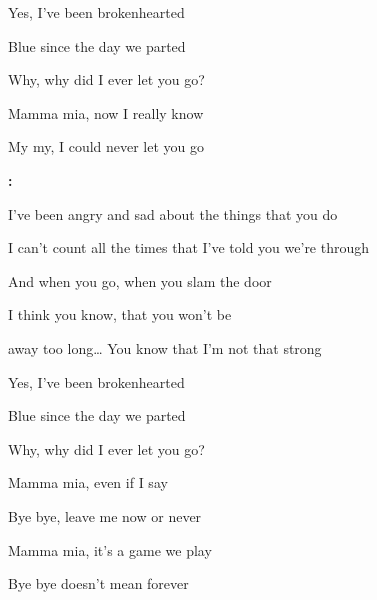 \begin{song}
\smallskip

\begin{chorusbox}{\Bridge}
Yes, I've been brokenhearted \par
{}Blue since the day we parted \par
{} Why, why did I ever let you go? \par
{} Mamma mia,  now I really know \par
{} My my, I could never let you go \par
\end{chorusbox}

\bigskip

\Instrumental\textbf{:}     \par

\bigskip

I've been angry and sad about the things that you do \par
{}I can't count all the times that I've told you we're through \par
{}And when you go,  when you slam the door \par
{}I think you know,  that you won't be \par
away too long… You know that I'm not that strong  \par

\bigskip

\PrechorusAndChorus

\bigskip

Yes, I've been brokenhearted \par
{}Blue since the day we parted \par
{} Why, why did I ever let you go? \par

\bigskip

Mamma mia, even if I say \par
{} Bye bye, leave me now or never \par
{}Mamma mia, it's a game we play \par
{} Bye bye doesn't mean forever \par


\end{song}
